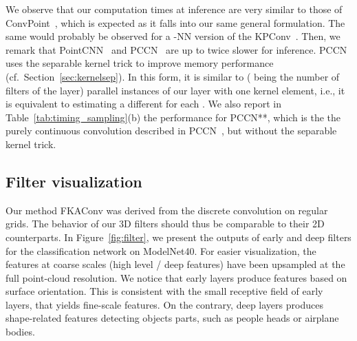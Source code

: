 We observe that our computation times at inference are very similar to those of ConvPoint~\cite{boulch2020convpoint}, which is expected as it falls into our same general formulation.
The same would probably be observed for a -NN version of the KPConv~\cite{thomas2019kpconv}.
Then, we remark that PointCNN~\cite{li2018pointcnn} and PCCN~\cite{wang2018deep} are up to twice slower for inference.
PCCN uses the separable kernel trick to improve memory performance (cf.\ Section~\ref{sec:kernelsep}).
In this form, it is similar to  ( being the number of filters of the layer) parallel instances of our layer with one kernel element, i.e., it is equivalent to estimating a different  for each .
We also report in Table~\ref{tab:timing_sampling}(b) the performance for PCCN**, which is the the purely continuous convolution described in PCCN~\cite{wang2018deep}, but without the separable kernel trick.

\subsection{Filter visualization}

Our method FKAConv was derived from the discrete convolution on regular grids. The behavior of our 3D filters should thus be comparable to their 2D counterparts.
In Figure~\ref{fig:filter}, we present the outputs of early and deep filters for the classification network on ModelNet40.
For easier visualization, the features at coarse scales (high level / deep features) have been upsampled at the full point-cloud resolution.
We notice that early layers produce features based on surface orientation. This is consistent with the small receptive field of early layers, that yields fine-scale features.
On the contrary, deep layers produces shape-related features detecting objects parts, such as people heads or airplane bodies.

